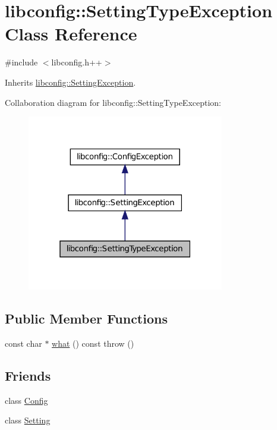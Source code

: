 \hypertarget{classlibconfig_1_1_setting_type_exception}{
\section{libconfig::SettingTypeException Class Reference}
\label{classlibconfig_1_1_setting_type_exception}
}


{\ttfamily \#include $<$libconfig.h++$>$}



Inherits \hyperlink{classlibconfig_1_1_setting_exception}{libconfig::SettingException}.



Collaboration diagram for libconfig::SettingTypeException:
\nopagebreak
\begin{figure}[H]
\begin{center}
\leavevmode
\includegraphics[width=244pt]{classlibconfig_1_1_setting_type_exception__coll__graph}
\end{center}
\end{figure}
\subsection*{Public Member Functions}
\begin{DoxyCompactItemize}
\item 
const char $\ast$ \hyperlink{classlibconfig_1_1_setting_type_exception_a50c015f8011c3ffa3dce6a4a25072ec7}{what} () const   throw ()
\end{DoxyCompactItemize}
\subsection*{Friends}
\begin{DoxyCompactItemize}
\item 
class \hyperlink{classlibconfig_1_1_setting_type_exception_ac3da7e21a05bf8852638db7e4dd1b81a}{Config}
\item 
class \hyperlink{classlibconfig_1_1_setting_type_exception_a9aa0bc1c3d297cabf9a1848178294d38}{Setting}
\end{DoxyCompactItemize}


